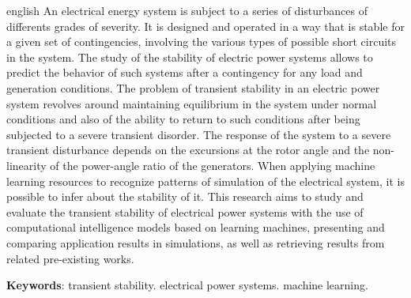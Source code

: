 \documentclass[12pt,oneside,a4paper,chapter=TITLE,section=TITLE,sumario=tradicional,english,brazil]{abntex2}
\newcommand{\listofquadrosname}{Lista de quadros}
\begin{document}
\begin{resumo}[Abstract]
 \begin{otherlanguage*}{english}
 \setlength{\absparsep}{18pt}
  An electrical energy system is subject to a series of disturbances of differents grades of severity. It is designed and operated in a way that is stable for a given set of contingencies, involving the various types of possible short circuits in the system. The study of the stability of electric power systems allows to predict the behavior of such systems after a contingency for any load and generation conditions.
The problem of transient stability in an electric power system revolves around maintaining equilibrium in the system under normal conditions and also of the ability to return to such conditions after being subjected to a severe transient disorder. The response of the system to a severe transient disturbance depends on the excursions at the rotor angle and the non-linearity of the power-angle ratio of the generators. When applying machine learning resources to recognize patterns of simulation of the electrical system, it is possible to infer about the stability of it.
This research aims to study and evaluate the transient stability of electrical power systems with the use of computational intelligence models based on learning machines, presenting and comparing application results in simulations, as well as retrieving results from related pre-existing works.

   \vspace{\onelineskip}
 
   \noindent 
   \textbf{Keywords}: transient stability. electrical power systems. machine learning.
 \end{otherlanguage*}
\end{resumo}
	
\listoffigures*
\cleardoublepage


\listoftables*
\cleardoublepage
\end{document}
